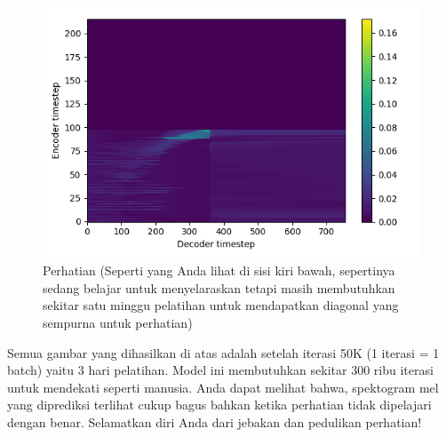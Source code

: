 \begin{figure}[H]
        \centerline{\includegraphics[scale=.75]{figures/ref3}}
        \caption{Perhatian (Seperti yang Anda lihat di sisi kiri bawah, sepertinya sedang belajar untuk menyelaraskan tetapi masih membutuhkan sekitar satu minggu pelatihan untuk mendapatkan diagonal yang sempurna untuk perhatian)}
		\label{ref3}
\end{figure}
Semua gambar yang dihasilkan di atas adalah setelah iterasi 50K (1 iterasi = 1 batch) yaitu 3 hari pelatihan. Model ini membutuhkan sekitar 300 ribu iterasi untuk mendekati seperti manusia. Anda dapat melihat bahwa, spektogram mel yang diprediksi terlihat cukup bagus bahkan ketika perhatian tidak dipelajari dengan benar. Selamatkan diri Anda dari jebakan dan pedulikan perhatian!

